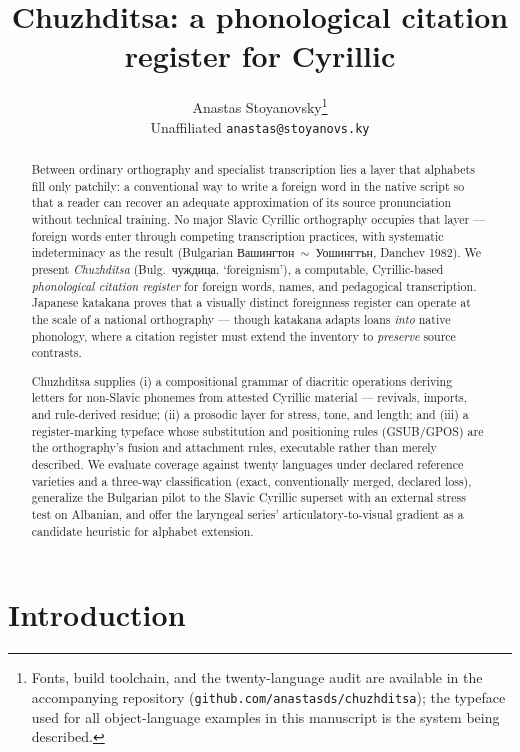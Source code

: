 \documentclass[11pt]{article}
\title{\textbf{Chuzhditsa: a phonological citation register for Cyrillic}}
\author{Anastas Stoyanovsky\thanks{Fonts, build toolchain, and the twenty-language audit are available in the accompanying repository (\texttt{github.com/anastasds/chuzhditsa}); the typeface used for all object-language examples in this manuscript is the system being described.}\\[3pt] {\normalsize Unaffiliated \quad \texttt{anastas@stoyanovs.ky}}}
\date{}
\newcommand{\cz}[1]{{\chu #1}}
\begin{document}
\maketitle

\begin{abstract}
\noindent Between ordinary orthography and specialist transcription lies a layer that alphabets fill only patchily: a conventional way to write a foreign word in the native script so that a reader can recover an adequate approximation of its source pronunciation without technical training. No major Slavic Cyrillic orthography occupies that layer — foreign words enter through competing transcription practices, with systematic indeterminacy as the result (Bulgarian \cz{Вашингтон}~$\sim$~\cz{Уошингтън}, Danchev 1982). We present \emph{Chuzhditsa} (Bulg.\ чуждица, `foreignism'), a computable, Cyrillic-based \emph{phonological citation register} for foreign words, names, and pedagogical transcription. Japanese katakana proves that a visually distinct foreignness register can operate at the scale of a national orthography — though katakana adapts loans \emph{into} native phonology, where a citation register must extend the inventory to \emph{preserve} source contrasts.

Chuzhditsa supplies (i) a compositional grammar of diacritic operations deriving letters for non-Slavic phonemes from attested Cyrillic material — revivals, imports, and rule-derived residue; (ii) a prosodic layer for stress, tone, and length; and (iii) a register-marking typeface whose substitution and positioning rules (GSUB/GPOS) are the orthography's fusion and attachment rules, executable rather than merely described. We evaluate coverage against twenty languages under declared reference varieties and a three-way classification (exact, conventionally merged, declared loss), generalize the Bulgarian pilot to the Slavic Cyrillic superset with an external stress test on Albanian, and offer the laryngeal series' articulatory-to-visual gradient as a candidate heuristic for alphabet extension.
\end{abstract}

\section{Introduction}
\end{document}
